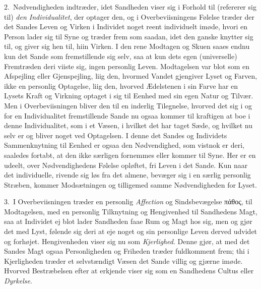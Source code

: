 \documentclass[12pt,a4paper]{book}
\newcommand{\apage}[1]{\marginnote{\footnotesize\textit{[#1]}}}
\begin{document}
2.~Nødvendigheden indtræder, idet Sandheden viser sig i Forhold til (refererer
sig til) \emph{den Individualitet}, der optager den, og i Overbeviisningens
Følelse træder der det Sandes Leven og Virken i Individet noget reent
individuelt imøde,%
 hvori en Person lader sig til Syne og træder frem som saadan, idet den ganske
knytter sig til, og giver sig hen til, hiin Virken. I den rene Modtagen og Skuen
saaes endnu kun det Sande som fremstillende sig selv, saa at kun dets egen
(universelle) Fremtræden deri viiste sig, ingen personlig Leven. Modtagelsen var
blot som en Afspejling eller Gjenspejling, liig den, hvormed Vandet gjengiver
Lyset og Farven, ikke en personlig Optagelse, liig den, hvorved Ædelstenen i sin
Farve har en Lysets Kraft og Virkning optaget i sig til Eenhed med sin egen
Natur og Tilvær. Men i Overbeviisningen bliver den til en \apage{10} inderlig Tilegnelse,
hvorved det sig i og for en Individualitet fremstillende Sande nu ogsaa kommer
til kraftigen at boe i denne Individualitet, som i et Væsen, i hvilket det har
taget Sæde, og hvilket nu selv er og bliver noget ved Optagelsen. I denne det
Sandes og Individets Sammenknytning til Eenhed er ogsaa den Nødvendighed, som
vistnok er deri, saaledes fortabt, at den ikke særligen fornemmes eller kommer
til Syne. Her er en udeelt, over Nødvendighedens Følelse opløftet, fri
Leven i det Sande. Kun naar det individuelle, rivende sig løs fra det almene,
bevæger sig i en særlig personlig Stræben, kommer Modsætningen og tilligemed
samme Nødvendigheden for Lyset.

3.~I Overbeviisningen træder en personlig \emph{Affection} og Sindsbevægelse
πάθος, til Modtagelsen, med en personlig Tilknytning og Hengivenhed til
Sandhedens Magt, saa at Individet ej blot lader Sandheden faae Rum og Magt hos
sig, men og gjør det med Lyst, følende sig deri at eje noget og sin personlige
Leven derved udvidet og forhøjet. Hengivenheden viser sig nu som
\emph{Kjerlighed}. Denne gjør, at med det Sandes Magt ogsaa Personligheden og
Friheden træder fuldkomment frem; thi i Kjerligheden træder et selvstændigt
Væsen det Sande villig og gjærne imøde. Hvorved Bestræbelsen efter at erkjende \apage{11} 
viser sig som en Sandhedens Cultus eller \emph{Dyrkelse}.
\end{document}
